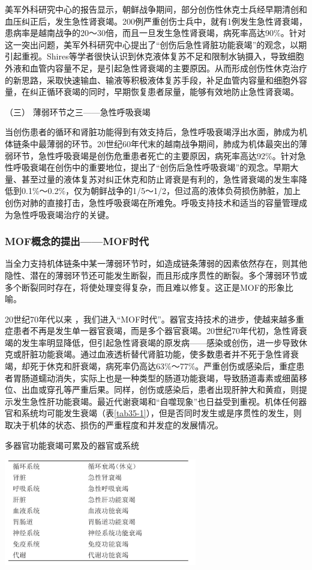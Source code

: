 美军外科研究中心的报告显示，朝鲜战争期间，部分创伤性休克士兵经早期清创和血压纠正后，发生急性肾衰竭。200例严重创伤士兵中，就有1例发生急性肾衰竭，患病率是越南战争的20～30倍，而且一旦发生急性肾衰竭，病死率高达90\%。针对这一突出问题，美军外科研究中心提出了“创伤后急性肾脏功能衰竭”的观念，以期引起重视。Shires等学者很快认识到休克液体复苏不足和限制水钠摄入，导致细胞外液和血管内容量不足，是引起急性肾衰竭的主要原因。从而形成创伤性休克治疗的新思路，采取快速输血、输液等积极液体复苏手段，补足血管内容量和细胞外容量，在纠正循环衰竭的同时，早期恢复患者尿量，能够有效地防止急性肾衰竭。

\hypertarget{text00092.htmlux5cux23CHP3-11-1-1-3}{}
（三） 薄弱环节之三------急性呼吸衰竭

当创伤患者的循环和肾脏功能得到有效支持后，急性呼吸衰竭浮出水面，肺成为机体链条中最薄弱的环节。20世纪60年代末的越南战争期间，肺成为机体最突出的薄弱环节，急性呼吸衰竭是创伤危重患者死亡的主要原因，病死率高达92\%。针对急性呼吸衰竭在创伤中的重要地位，提出了“创伤后急性呼吸衰竭”的观念。早期大量、甚至过量的液体复苏对纠正休克和防止肾衰是有利的，急性肾衰竭的发生率降低到0.1\%～0.2\%，仅为朝鲜战争的1/5～1/2，但过高的液体负荷损伤肺脏，加上创伤对肺的直接打击，急性呼吸衰竭在所难免。呼吸支持技术和适当的容量管理成为急性呼吸衰竭治疗的关键。

\subsubsection{MOF概念的提出------MOF时代}

当全力支持机体链条中某一薄弱环节时，如造成链条薄弱的因素依然存在，则其他隐性、潜在的薄弱环节还可能发生断裂，而且形成序贯性的断裂。多个薄弱环节或多个断裂同时存在，将使处理变得复杂，而且难以修复。这正是MOF的形象比喻。

20世纪70年代以来
，我们进入“MOF时代”。器官支持技术的进步，使越来越多重症患者不再是发生单一器官衰竭，而是多个器官衰竭。20世纪70年代初，急性肾衰竭的发生率明显降低，但引起急性肾衰竭的原发病------感染或创伤，进一步导致休克或肝脏功能衰竭。通过血液透析替代肾脏功能，使多数患者并不死于急性肾衰竭，却死于休克和肝衰竭，病死率仍高达63\%～77\%。严重创伤或感染后，重症患者胃肠道蠕动消失，实际上也是一种类型的肠道功能衰竭，导致肠道毒素或细菌移位、出血或穿孔等严重后果。同样，创伤或感染后，患者出现肝肿大和黄疸，则提示发生急性肝功能衰竭。最近代谢衰竭和“自噬现象”也日益受到重视。机体任何器官和系统均可能发生衰竭（表\ref{tab35-1}），但是否同时发生或是序贯性的发生，则取决于机体的状态、损伤的严重程度和并发症的发展情况。

\begin{table}[htbp]
\centering
\caption{多器官功能衰竭可累及的器官或系统}
\label{tab35-1}
\includegraphics[width=3.3125in,height=1.83333in]{./images/Image00130.jpg}
\end{table}

